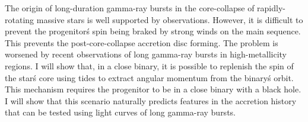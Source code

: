 


\bigskip



\bigskip

\noindent The origin of long-duration gamma-ray bursts in the core-collapse of
rapidly-rotating massive stars is well supported by observations. However, it is difficult to prevent the progenitor\'s spin being braked by strong winds on the main sequence.  This prevents the post-core-collapse accretion disc forming.  The problem is worsened by recent observations of long gamma-ray bursts in high-metallicity regions.  I will show that, in a close binary, it is possible to replenish the spin of the star\'s core using tides to extract angular momentum from the binary\'s orbit.  This mechanism requires the progenitor to be in a close binary with a black hole.  I will show that this scenario naturally predicts features in the accretion history that can be tested using light curves of long gamma-ray bursts.
